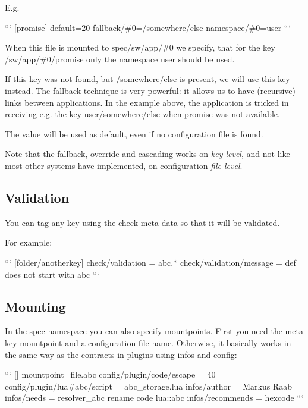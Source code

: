 E.\+g.

``` \mbox{[}promise\mbox{]} default=20 fallback/\#0=/somewhere/else namespace/\#0=user ```


\begin{DoxyEnumerate}
\item When this file is mounted to {\ttfamily spec/sw/app/\#0} we specify, that for the key {\ttfamily /sw/app/\#0/promise} only the namespace {\ttfamily user} should be used.
\item If this key was not found, but {\ttfamily /somewhere/else} is present, we will use this key instead. The {\ttfamily fallback} technique is very powerful\+: it allows us to have (recursive) links between applications. In the example above, the application is tricked in receiving e.\+g. the key {\ttfamily user/somewhere/else} when {\ttfamily promise} was not available.
\item The value {} will be used as default, even if no configuration file is found.
\end{DoxyEnumerate}

Note that the fallback, override and cascading works on {\itshape key level}, and not like most other systems have implemented, on configuration {\itshape file level}.

\subsection*{Validation}

You can tag any key using the {\ttfamily check} meta data so that it will be validated.

For example\+:

``` \mbox{[}folder/anotherkey\mbox{]} check/validation = abc.$\ast$ check/validation/message = def does not start with abc ```

\subsection*{Mounting}

In the spec namespace you can also specify mountpoints. First you need the meta key {\ttfamily mountpoint} and a configuration file name. Otherwise, it basically works in the same way as the contracts in plugins using {\ttfamily infos} and {\ttfamily config}\+:

``` \mbox{[}\mbox{]} mountpoint=file.\+abc config/plugin/code/escape = 40 config/plugin/lua\#abc/script = abc\+\_\+storage.\+lua infos/author = Markus Raab infos/needs = resolver\+\_\+abc rename code lua\+::abc infos/recommends = hexcode ```

